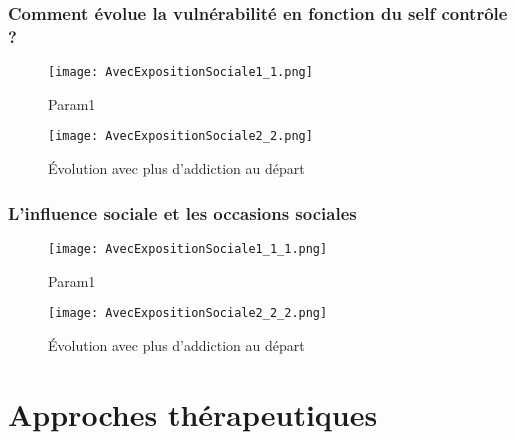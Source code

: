\documentclass{beamer}
\begin{document}
\begin{frame}
	\frametitle{Comment évolue la vulnérabilité en fonction du self contrôle ?}
	\begin{minipage}{0.45\linewidth}
		\centering
		\begin{figure}
			\texttt{[image: AvecExpositionSociale1\_1.png]}
			\captionsetup{justification=raggedleft, skip=5pt}
			\caption{Param1}
		\end{figure}
	\end{minipage}\hfill
	\begin{minipage}{0.45\linewidth}
		\centering
		\begin{figure}
			\texttt{[image: AvecExpositionSociale2\_2.png]}
			\captionsetup{justification=centering, skip=5pt}
			\caption{Évolution avec plus d'addiction au départ}
		\end{figure}
	\end{minipage}
\end{frame}

\begin{frame}
	\frametitle{L'influence sociale et les occasions sociales}
	\begin{minipage}{0.45\linewidth}
		\centering
		\begin{figure}
			\vspace{-0.45cm}
			\texttt{[image: AvecExpositionSociale1\_1\_1.png]}
			\captionsetup{justification=centering, skip=5pt}
			\caption{Param1}
		\end{figure}
	\end{minipage}\hfill
	\begin{minipage}{0.45\linewidth}
		\centering
		\begin{figure}
			\texttt{[image: AvecExpositionSociale2\_2\_2.png]}
			\captionsetup{justification=centering, skip=5pt}
			\caption{Évolution avec plus d'addiction au départ}
		\end{figure}
	\end{minipage}
\end{frame}

\section{Approches thérapeutiques}
\end{document}
